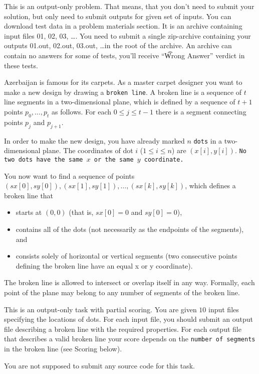 This is an output-only problem. That means, that you don't need to submit your solution, but only need to submit outputs for given set of inputs. You can download test data in a problem materials section. It is an archive containing input files 01, 02, 03, \dots. You need to submit a single zip-archive containing your outputs 01.out, 02.out, 03.out, \dots in the root of the archive.  An archive can contain no answers for some of tests, you'll receive ``\t{Wrong Answer}'' verdict in these tests.

Azerbaijan is famous for its carpets.
As a master carpet designer you want to make a new design by drawing a \texttt{broken line}.
A broken line is a sequence of $t$ line segments in a two-dimensional plane, which is defined by a sequence of $t+1$ points $p_0, \ldots, p_t$ as follows.
For each $0 \leq j \leq t-1$ there is a segment connecting points $p_j$ and $p_{j+1}$.

In order to make the new design, you have already marked $n$ \texttt{dots} in a two-dimensional plane.
The coordinates of dot $i$ ($1 \leq i \leq n$) are $(x[i], y[i])$.
\texttt{No two dots have the same $x$ or the same $y$ coordinate.}

You now want to find a sequence of points $(sx[0], sy[0]), (sx[1], sy[1]), \ldots, (sx[k], sy[k])$, which defines a broken line that
\begin{itemize}
\item starts at $(0,0)$ (that is, $sx[0]=0$ and $sy[0]=0$),
\item contains all of the dots (not necessarily as the endpoints of the segments), and
\item consists solely of horizontal or vertical segments (two consecutive points defining the broken line have an equal x or y coordinate).
\end{itemize}

The broken line is allowed to intersect or overlap itself in any way. Formally, each point of the plane may belong to any number of segments of the broken line.

This is an output-only task with partial scoring.
You are given $10$ input files specifying the locations of dots.
For each input file, you should submit an output file describing a broken line with the required properties.
For each output file that describes a valid broken line your score depends on the \texttt{number of segments} in the broken line (see Scoring below).

You are not supposed to submit any source code for this task.

